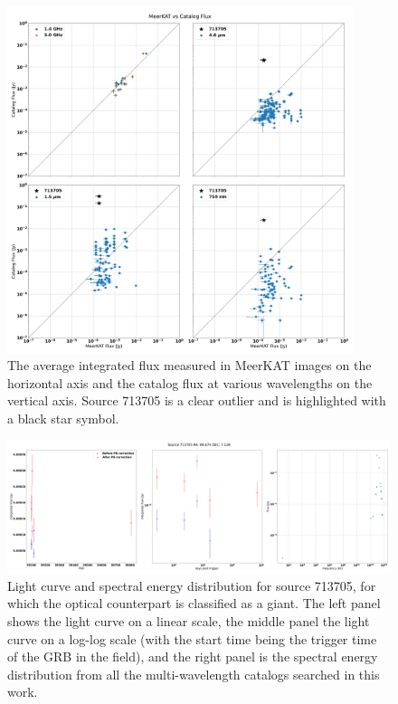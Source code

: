 \documentclass[12pt]{article}
\begin{document}
\begin{figure}
	\includegraphics[width=0.9\textwidth]{combinedfluxfluxplots.png}
	\caption{The average integrated flux measured in MeerKAT images on the horizontal axis and the catalog flux at various wavelengths on the vertical axis. Source 713705 is a clear outlier and is highlighted with a black star symbol.}
	\label{fig:combinedfluxfluxplots}
\end{figure}

\begin{figure}
	\includegraphics[width=\textwidth]{src713705lc4.png}
	\caption{Light curve and spectral energy distribution for source 713705, for which the optical counterpart is classified as a giant. The left panel shows the light curve on a linear scale, the middle panel the light curve on a log-log scale (with the start time being the trigger time of the GRB in the field), and the right panel is the spectral energy distribution from all the multi-wavelength catalogs searched in this work.}
	\label{fig:src713705lc4.png}
\end{figure}
\end{document}
